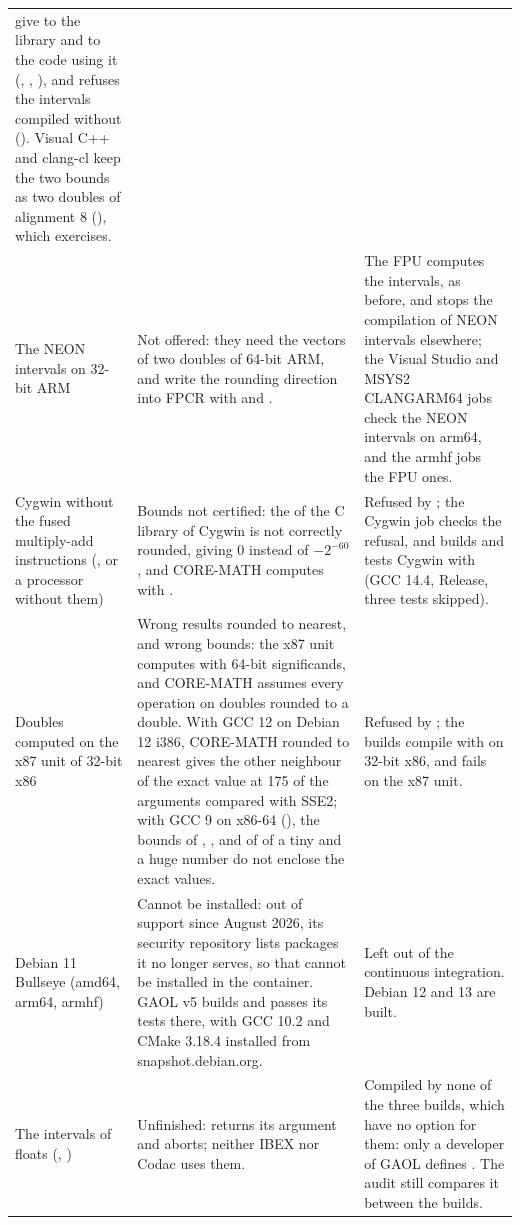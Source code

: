 \documentclass[12pt,a4paper,twoside,openright]{book}
\begin{document}
\begin{longtable}{L{2.9cm}L{5.8cm}L{5cm}}
    give  to the library and to the code using it
    (, , ), and
     refuses the intervals compiled without
    (). Visual C++ and clang-cl keep the two
    bounds as two doubles of alignment 8
    (), which
     exercises.\\
  The NEON intervals on 32-bit ARM & Not offered: they need the vectors of
    two doubles of 64-bit ARM, and write the rounding direction into FPCR
    with  and . & The FPU computes the intervals, as
    before, and  stops the compilation of NEON
    intervals elsewhere; the Visual Studio and MSYS2 CLANGARM64 jobs check
    the NEON intervals on arm64, and the armhf jobs the FPU ones.\\
  Cygwin without the fused multiply-add instructions
    (, or a processor without them) & Bounds not
    certified: the  of the C library of Cygwin is not correctly
    rounded,  giving 0 instead of
    $-2^{-60}$, and CORE-MATH computes with . & Refused by
    ; the Cygwin job checks the refusal, and
    builds and tests Cygwin with  (GCC 14.4, Release, three
    tests skipped).\\
  Doubles computed on the x87 unit of 32-bit x86 & Wrong results rounded to
    nearest, and wrong bounds: the x87 unit computes with 64-bit
    significands, and CORE-MATH assumes every operation on doubles rounded
    to a double. With GCC 12 on Debian 12 i386, CORE-MATH rounded to nearest
    gives the other neighbour of the exact value at 175 of the arguments
    compared with SSE2; with GCC 9 on x86-64 (), the
    bounds of , ,  and
    of  of a tiny and a huge number do not enclose the exact
    values. & Refused by ; the builds compile with
     on 32-bit x86, and
     fails on the x87 unit.\\
  Debian 11 Bullseye (amd64, arm64, armhf) & Cannot be installed: out of
    support since August 2026, its security repository lists packages it no
    longer serves, so that  cannot be installed in the container.
    GAOL v5 builds and passes its tests there, with GCC 10.2 and CMake
    3.18.4 installed from snapshot.debian.org. & Left out of the continuous
    integration. Debian 12 and 13 are built.\\
  The intervals of floats (,
    )
    & Unfinished:  returns its argument and
     aborts; neither IBEX nor Codac uses them.
    & Compiled by none of the three builds, which have no option for them:
    only a developer of GAOL defines . The
    audit still compares it between the builds.\\
\end{longtable}
\end{document}
